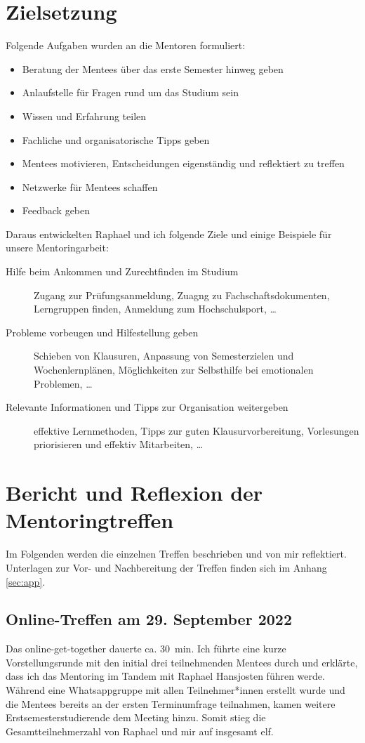 \documentclass[
    paper=A4,
    div=calc,
    numbers=noendperiod
]{scrartcl}
\begin{document}
\section{Zielsetzung}
    Folgende Aufgaben wurden an die Mentoren formuliert:

    \begin{itemize}
        \item Beratung der Mentees über das erste Semester hinweg geben
        \item Anlaufstelle für Fragen rund um das Studium sein
        \item Wissen und Erfahrung teilen
        \item Fachliche und organisatorische Tipps geben
        \item Mentees motivieren, Entscheidungen eigenständig und reflektiert zu treffen
        \item Netzwerke für Mentees schaffen
        \item Feedback geben
    \end{itemize}

    Daraus entwickelten Raphael und ich folgende Ziele und einige Beispiele für unsere Mentoringarbeit:
    \begin{description}
        \item[Hilfe beim Ankommen und Zurechtfinden im Studium] Zugang zur Prüfungsanmeldung, Zuagng zu Fachschaftsdokumenten, Lerngruppen finden, Anmeldung zum Hochschulsport, \dots
        \item [Probleme vorbeugen und Hilfestellung geben] Schieben von Klausuren, 
        Anpassung von Semesterzielen und Wochenlernplänen, Möglichkeiten zur Selbsthilfe bei emotionalen Problemen, \dots
        \item [Relevante Informationen und Tipps zur Organisation weitergeben] effektive Lernmethoden, Tipps zur guten Klausurvorbereitung, Vorlesungen priorisieren und effektiv Mitarbeiten, \dots
    \end{description}

\section{Bericht und Reflexion der Mentoringtreffen}
    Im Folgenden werden die einzelnen Treffen beschrieben und von mir reflektiert. Unterlagen zur Vor- und Nachbereitung der Treffen finden sich im Anhang \ref{sec:app}. 

    \subsection{Online-Treffen am 29. September 2022}
        Das online-get-together dauerte ca. \SI{30}{\minute}. Ich führte eine kurze Vorstellungsrunde mit den initial drei teilnehmenden Mentees durch und erklärte, dass ich das Mentoring im Tandem mit Raphael Hansjosten führen werde. Während eine Whatsappgruppe mit allen Teilnehmer*innen erstellt wurde und die Mentees bereits an der ersten Terminumfrage teilnahmen, kamen weitere Erstsemesterstudierende dem Meeting hinzu. Somit stieg die Gesamtteilnehmerzahl von Raphael und mir auf insgesamt elf.
\end{document}
